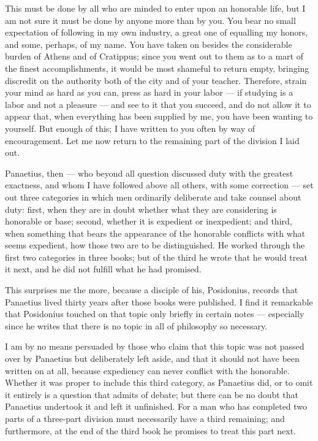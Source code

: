  This must be done by all who are minded to enter upon an honorable life, but I am not sure it must be done by anyone more than by you. You bear no small expectation of following in my own industry, a great one of equalling my honors, and some, perhaps, of my name. You have taken on besides the considerable burden of Athens and of Cratippus; since you went out to them as to a mart of the finest accomplishments, it would be most shameful to return empty, bringing discredit on the authority both of the city and of your teacher. Therefore, strain your mind as hard as you can, press as hard in your labor — if studying is a labor and not a pleasure — and see to it that you succeed, and do not allow it to appear that, when everything has been supplied by me, you have been wanting to yourself. But enough of this; I have written to you often by way of encouragement. Let me now return to the remaining part of the division I laid out.

 Panaetius, then — who beyond all question discussed duty with the greatest exactness, and whom I have followed above all others, with some correction — set out three categories in which men ordinarily deliberate and take counsel about duty: first, when they are in doubt whether what they are considering is honorable or base; second, whether it is expedient or inexpedient; and third, when something that bears the appearance of the honorable conflicts with what seems expedient, how those two are to be distinguished. He worked through the first two categories in three books; but of the third he wrote that he would treat it next, and he did not fulfill what he had promised.

 This surprises me the more, because a disciple of his, Posidonius, records that Panaetius lived thirty years after those books were published. I find it remarkable that Posidonius touched on that topic only briefly in certain notes — especially since he writes that there is no topic in all of philosophy so necessary.

 I am by no means persuaded by those who claim that this topic was not passed over by Panaetius but deliberately left aside, and that it should not have been written on at all, because expediency can never conflict with the honorable. Whether it was proper to include this third category, as Panaetius did, or to omit it entirely is a question that admits of debate; but there can be no doubt that Panaetius undertook it and left it unfinished. For a man who has completed two parts of a three-part division must necessarily have a third remaining; and furthermore, at the end of the third book he promises to treat this part next.

